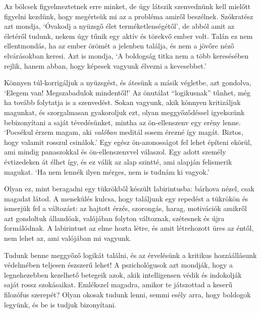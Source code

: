 Az bölcsek figyelmeztetnek erre minket, de úgy látszik szenvednünk kell
mielőtt figyelni kezdünk, hogy megértsük mi az a probléma amiről
beszélnek. Szókratész azt mondja, `Óvakodj a nyüzsgő élet
terméketlenségétől', de abból amit az életéről tudunk, nekem úgy tűnik
egy aktív és törekvő ember volt. Talán ez nem ellentmondás, ha az ember
örömét a jelenben találja, és nem a jövőre néző elvárásokban keresi. Azt
is mondja, `A boldogság titka nem a több keresésében rejlik, hanem
abban, hogy képesek vagyunk élvezni a kevesebbet.'

Könnyen túl-korrigáljuk a nyüzsgést, és átesünk a másik végletbe, azt
gondolva, `Elegem van! Megszabadulok mindentől!' Az önutálat
``logikusnak'' tűnhet, még ha tovább folytatja is a szenvedést. Sokan
vagyunk, akik könnyen kritizáljuk magunkat, és szorgalmasan gyakoroljuk
ezt, olyan meggyőződéssel igyekszünk bebizonyítani a saját tévedésünket,
mintha az ön-ellenszenv egy erény lenne. `Pocsékul érzem magam, aki
\emph{valóban} meditál sosem érezné így magát. Biztos, hogy valamit
rosszul csinálok.' Egy egész ön-azonosságot fel lehet építeni ekörül,
ami mindig panaszokkal és ön-ellenszenvvel válaszol. Egy adott személy
évtizedeken át élhet így, és ez válik az alap szintté, ami alapján
felismerik magukat. `Ha nem lennék ilyen mérges, nem is tudnám ki
vagyok.'

Olyan ez, mint beragadni egy tükrökből készült labirintusba: bárhova
nézel, csak magadat látod. A menekülés kulcsa, hogy találjunk egy
repedést a tükrökön és ismerjük fel a változást: az hajtott érzés,
szorongás, harag, motivációk amikről azt gondoltuk állandóak, valójában
folyton változnak, szétesnek és újra formálódnak. A labirintust az elme
hozta létre, és amit létrehozott üres az éntől, nem lehet az, ami
valójában mi vagyunk.

Tudunk benne meggyőző logikát találni, és az érvelésünk a kritikus
hozzáállásunk védelmében teljesen észszerű lehet! A pszichológusok azt
mondják, hogy a legnehezebben kezelhető betegeik azok, akik
intelligensen védik és indokolják saját rossz szokásaikat. Emlékszel
magadra, amikor te játszottad a keserű filozófus szerepét? Olyan okosak
tudunk lenni, semmi esély arra, hogy boldogok legyünk, és be is tudjuk
bizonyítani.

